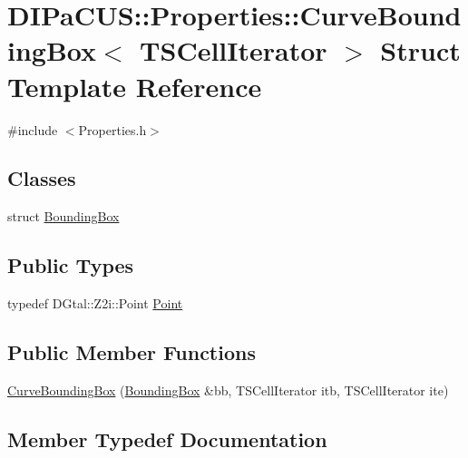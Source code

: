 \hypertarget{structDIPaCUS_1_1Properties_1_1CurveBoundingBox}{}\section{D\+I\+Pa\+C\+US\+:\+:Properties\+:\+:Curve\+Bounding\+Box$<$ T\+S\+Cell\+Iterator $>$ Struct Template Reference}
\label{structDIPaCUS_1_1Properties_1_1CurveBoundingBox}


{\ttfamily \#include $<$Properties.\+h$>$}

\subsection*{Classes}
\begin{DoxyCompactItemize}
\item 
struct \mbox{\hyperlink{structDIPaCUS_1_1Properties_1_1CurveBoundingBox_1_1BoundingBox}{Bounding\+Box}}
\end{DoxyCompactItemize}
\subsection*{Public Types}
\begin{DoxyCompactItemize}
\item 
typedef D\+Gtal\+::\+Z2i\+::\+Point \mbox{\hyperlink{structDIPaCUS_1_1Properties_1_1CurveBoundingBox_ad97cc519eea736f20195540853c23616}{Point}}
\end{DoxyCompactItemize}
\subsection*{Public Member Functions}
\begin{DoxyCompactItemize}
\item 
\mbox{\hyperlink{structDIPaCUS_1_1Properties_1_1CurveBoundingBox_ae2f636bbbe52447ad70d8195737e5597}{Curve\+Bounding\+Box}} (\mbox{\hyperlink{structDIPaCUS_1_1Properties_1_1CurveBoundingBox_1_1BoundingBox}{Bounding\+Box}} \&bb, T\+S\+Cell\+Iterator itb, T\+S\+Cell\+Iterator ite)
\end{DoxyCompactItemize}


\subsection{Member Typedef Documentation}
\mbox{\label{structDIPaCUS_1_1Properties_1_1CurveBoundingBox_ad97cc519eea736f20195540853c23616}} 
